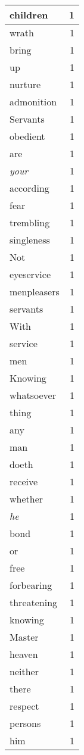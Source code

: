 \begin{center}
\begin{longtable}{l|r}
children & 1\\ \hline 
wrath & 1\\ \hline 
bring & 1\\ \hline 
up & 1\\ \hline 
nurture & 1\\ \hline 
admonition & 1\\ \hline 
Servants & 1\\ \hline 
obedient & 1\\ \hline 
are & 1\\ \hline 
\emph{your} & 1\\ \hline 
according & 1\\ \hline 
fear & 1\\ \hline 
trembling & 1\\ \hline 
singleness & 1\\ \hline 
Not & 1\\ \hline 
eyeservice & 1\\ \hline 
menpleasers & 1\\ \hline 
servants & 1\\ \hline 
With & 1\\ \hline 
service & 1\\ \hline 
men & 1\\ \hline 
Knowing & 1\\ \hline 
whatsoever & 1\\ \hline 
thing & 1\\ \hline 
any & 1\\ \hline 
man & 1\\ \hline 
doeth & 1\\ \hline 
receive & 1\\ \hline 
whether & 1\\ \hline 
\emph{he} & 1\\ \hline 
bond & 1\\ \hline 
or & 1\\ \hline 
free & 1\\ \hline 
forbearing & 1\\ \hline 
threatening & 1\\ \hline 
knowing & 1\\ \hline 
Master & 1\\ \hline 
heaven & 1\\ \hline 
neither & 1\\ \hline 
there & 1\\ \hline 
respect & 1\\ \hline 
persons & 1\\ \hline 
him & 1\\ \hline 

\end{longtable}
\end{center}
